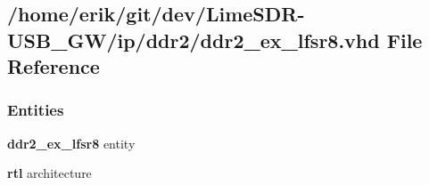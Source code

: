 \subsection{/home/erik/git/dev/\+Lime\+S\+D\+R-\/\+U\+S\+B\+\_\+\+G\+W/ip/ddr2/ddr2\+\_\+ex\+\_\+lfsr8.vhd File Reference}
\label{ddr2__ex__lfsr8_8vhd}
\subsubsection*{Entities}
\begin{DoxyCompactItemize}
\item 
{\bf ddr2\+\_\+ex\+\_\+lfsr8} entity
\item 
{\bf rtl} architecture
\end{DoxyCompactItemize}
